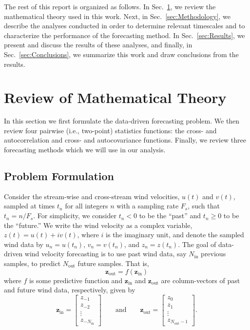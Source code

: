 \documentclass[11pt, oneside]{article}
\newcommand{\secref}[1]{Sec.~\ref{#1}}
\begin{document}
The rest of this report is organized as follows.
In \secref{sec:Theory}, we review the mathematical theory used in this work.
Next, in \secref{sec:Methodology}, we describe the analyses conducted in order to determine relevant timescales and to characterize the performance of the forecasting method.
In \secref{sec:Results}, we present and discuss the results of these analyses, and finally,
in \secref{sec:Conclusions}, we summarize this work and draw conclusions from the results.

\section{Review of Mathematical Theory}\label{sec:Theory}
In this section we first formulate the data-driven forecasting problem.
We then review four pairwise (i.e., two-point) statistics functions: the cross- and autocorrelation and cross- and autocovariance functions.
Finally, we review three forecasting methods which we will use in our analysis.

\subsection{Problem Formulation}
Consider the stream-wise and cross-stream wind velocities, $u(t)$ and $v(t)$, sampled at times $t_n$ for all integers $n$ with a sampling rate $F_s$, such that $t_n = n/F_s$.
For simplicity, we consider $t_n < 0$ to be the ``past'' and $t_n \geq 0$ to be the ``future.''
We write the wind velocity as a complex variable, $z(t) = u(t) + i v(t)$, where $i$ is the imaginary unit, and denote the sampled wind data by $u_n = u(t_n)$, $v_n = v(t_n)$, and $z_n = z(t_n)$.
The goal of data-driven wind velocity forecasting is to use past wind data, say $N_\text{in}$ previous samples, to predict $N_\text{out}$ future samples.
That is, 
\begin{equation}
\mathbf{z}_\text{out} = f(\mathbf{z}_\text{in})
\end{equation}
where $f$ is some predictive function and $\mathbf{z}_\textrm{in}$ and $\mathbf{z}_\text{out}$ are column-vectors of past and future wind data, respectively, given by
\begin{equation}
\mathbf{z}_\text{in} = 
\begin{bmatrix}
z_{-1} \\ z_{-2} \\ \vdots \\ z_{-N_\text{in}}
\end{bmatrix}
\quad\quad \text{and} \quad\quad
\mathbf{z}_\text{out} = 
\begin{bmatrix}
z_{0} \\ z_{1} \\ \vdots \\ z_{N_\text{out} - 1}
\end{bmatrix}.
\end{equation}
\end{document}
